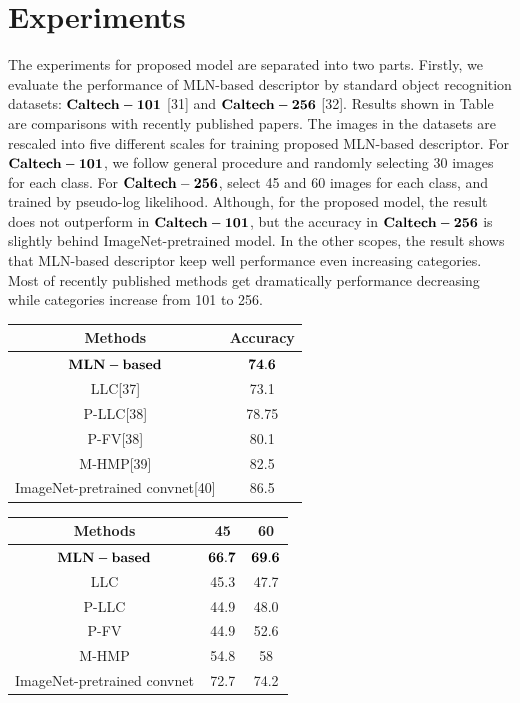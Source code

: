 \documentclass{tADR2e}
\begin{document}
\section{Experiments}
The experiments for proposed model are separated into two parts. Firstly, we evaluate the performance of MLN-based descriptor by standard object recognition datasets: $\bf{Caltech-101}$ [31] and $\bf{Caltech-256}$ [32]. Results shown in Table \uppercase\expandafter{} are comparisons with recently published papers. The images in the datasets are rescaled into five different scales for training proposed MLN-based descriptor. For $\bf{Caltech-101}$, we follow general procedure and randomly selecting 30 images for each class. For $\bf{Caltech-256}$, select 45 and 60 images for each class, and trained by pseudo-log likelihood. Although, for the proposed model, the result does not outperform in $\bf{Caltech-101}$, but the accuracy in $\bf{Caltech-256}$ is slightly behind ImageNet-pretrained model. In the other scopes, the result shows that MLN-based descriptor keep well performance even increasing categories. Most of recently published methods get dramatically performance decreasing while categories increase from 101 to 256. 


\begin{table}
{\begin{tabular}{|c|c|}
\hline
Methods & Accuracy \\
\hline
$\bf{MLN-based}$ & $\bf{74.6}$ \\
\hline
LLC[37] & 73.1 \\
\hline
P-LLC[38] & 78.75\\
\hline
P-FV[38] & 80.1\\
\hline
M-HMP[39] & 82.5 \\
\hline
ImageNet-pretrained convnet[40] & 86.5 \\
\hline
\end{tabular}}
\end{table}

\begin{table}
{\begin{tabular}{|c|c|c|}
\hline
Methods & 45 & 60 \\
\hline
$\bf{MLN-based}$ & $\bf{66.7}$ & $\bf{69.6}$ \\
\hline
LLC &  45.3 & 47.7\\
\hline
P-LLC & 44.9 & 48.0\\
\hline
P-FV & 44.9 & 52.6\\
\hline
M-HMP & 54.8 & 58 \\
\hline
ImageNet-pretrained convnet & 72.7 & 74.2 \\
\hline
\end{tabular}}
\end{table}
\end{document}
